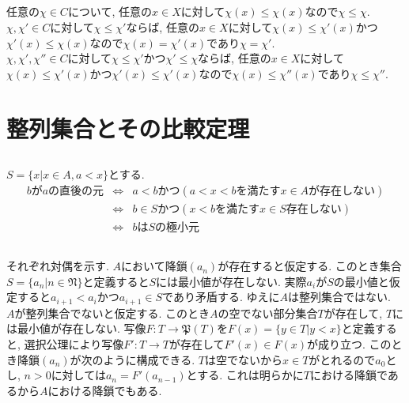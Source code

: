 \documentclass{jsarticle}
\begin{document}
\subsection{} %
任意の$\chi \in C$について, 任意の$x \in X$に対して$\chi(x) \le \chi(x)$なので$\chi \le \chi$.\\
$\chi, \chi' \in C$に対して$\chi \le \chi'$ならば, 任意の$x \in X$に対して$\chi(x) \le \chi'(x)$かつ$\chi'(x) \le \chi(x)$なので$\chi(x) = \chi'(x)$であり$\chi = \chi'$.\\
$\chi, \chi', \chi'' \in C$に対して$\chi \le \chi'$かつ$\chi' \le \chi$ならば, 任意の$x \in X$に対して$\chi(x) \le \chi'(x)$かつ$\chi'(x) \le \chi'(x)$なので$\chi(x) \le \chi''(x)$であり$\chi \le \chi''$.

\section{整列集合とその比較定理} %
\subsection{} %
$S = \{x | x \in A, a < x\}$とする.
\begin{eqnarray*}
	bがaの直後の元
	&\Leftrightarrow& a < bかつ(a < x < bを満たすx \in Aが存在しない)\\
	&\Leftrightarrow& b \in Sかつ(x < bを満たすx \in S存在しない)\\
	&\Leftrightarrow& bはSの極小元
\end{eqnarray*}

\subsection{} %
それぞれ対偶を示す. 
$A$において降鎖$(a_n)$が存在すると仮定する. このとき集合$S = \{a_n | n \in \mathfrak{N}\}$と定義すると$S$には最小値が存在しない. 実際$a_i$が$S$の最小値と仮定すると$a_{i + 1} < a_i$かつ$a_{i + 1} \in S$であり矛盾する. ゆえに$A$は整列集合ではない.\\
$A$が整列集合でないと仮定する. このとき$A$の空でない部分集合$T$が存在して, $T$には最小値が存在しない. 写像$F:T \rightarrow \mathfrak{P}(T)$を$F(x) = \{y \in T | y < x\}$と定義すると, 選択公理により写像$F': T \rightarrow T$が存在して$F'(x) \in F(x)$が成り立つ. このとき降鎖$(a_n)$が次のように構成できる. $T$は空でないから$x \in T$がとれるので$a_0$とし, $n > 0$に対しては$a_n = F'(a_{n - 1})$とする. これは明らかに$T$における降鎖であるから$A$における降鎖でもある.
\end{document}
